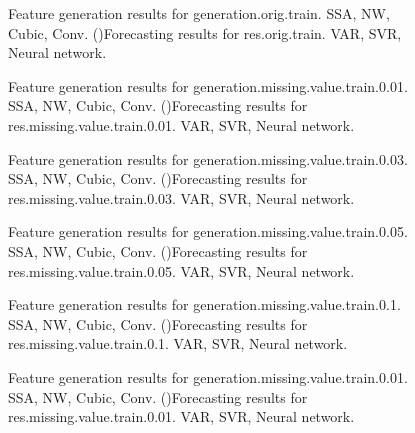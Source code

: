 \documentclass[12pt]{article}
\begin{document}
\begin{figure}
\centering
{}
\caption{Feature generation results for	generation.orig.train.	SSA, NW, Cubic, Conv. ()Forecasting results for	res.orig.train.	VAR, SVR, Neural network.}
\end{figure}


\begin{figure}
\centering
{}
\caption{Feature generation results for	generation.missing.value.train.0.01.	SSA, NW, Cubic, Conv. ()Forecasting results for	res.missing.value.train.0.01.	VAR, SVR, Neural network.}
\end{figure}


\begin{figure}
\centering
{}
\caption{Feature generation results for	generation.missing.value.train.0.03.	SSA, NW, Cubic, Conv. ()Forecasting results for	res.missing.value.train.0.03.	VAR, SVR, Neural network.}
\end{figure}


\begin{figure}
\centering
{}
\caption{Feature generation results for	generation.missing.value.train.0.05.	SSA, NW, Cubic, Conv. ()Forecasting results for	res.missing.value.train.0.05.	VAR, SVR, Neural network.}
\end{figure}


\begin{figure}
\centering
{}
\caption{Feature generation results for	generation.missing.value.train.0.1.	SSA, NW, Cubic, Conv. ()Forecasting results for	res.missing.value.train.0.1.	VAR, SVR, Neural network.}
\end{figure}


\begin{figure}
\centering
{}
\caption{Feature generation results for	generation.missing.value.train.0.01.	SSA, NW, Cubic, Conv. ()Forecasting results for	res.missing.value.train.0.01.	VAR, SVR, Neural network.}
\end{figure}
\end{document}
